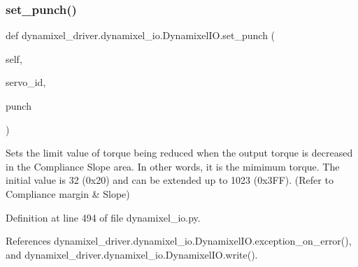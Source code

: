 \subsubsection{\texorpdfstring{set\+\_\+punch()}{set\_punch()}}
{\footnotesize\ttfamily def dynamixel\+\_\+driver.\+dynamixel\+\_\+io.\+Dynamixel\+I\+O.\+set\+\_\+punch (\begin{DoxyParamCaption}\item[{}]{self,  }\item[{}]{servo\+\_\+id,  }\item[{}]{punch }\end{DoxyParamCaption})}

\begin{DoxyVerb}Sets the limit value of torque being reduced when the output torque is
decreased in the Compliance Slope area. In other words, it is the mimimum
torque. The initial value is 32 (0x20) and can be extended up to 1023
(0x3FF). (Refer to Compliance margin & Slope)
\end{DoxyVerb}
 

Definition at line 494 of file dynamixel\+\_\+io.\+py.



References dynamixel\+\_\+driver.\+dynamixel\+\_\+io.\+Dynamixel\+I\+O.\+exception\+\_\+on\+\_\+error(), and dynamixel\+\_\+driver.\+dynamixel\+\_\+io.\+Dynamixel\+I\+O.\+write().


